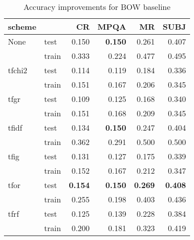 \begin{table}[H]
\begin{center}

\begin{tabular}{llrrrr}
\toprule
scheme &      &  CR &  MPQA &  MR &  SUBJ \\
\midrule
None & test &      0.150 &\textbf{0.150} &      0.261 &        0.407 \\
{} & train &      0.333 &        0.224 &      0.477 &        0.495 \\
tfchi2 & test &      0.114 &        0.119 &      0.184 &        0.336 \\
{} & train &      0.151 &        0.167 &      0.206 &        0.345 \\
tfgr & test &      0.109 &        0.125 &      0.168 &        0.340 \\
{} & train &      0.151 &        0.168 &      0.209 &        0.345 \\
tfidf & test &      0.134 &\textbf{0.150} &      0.247 &        0.404 \\
{} & train &      0.362 &        0.291 &      0.500 &        0.500 \\
tfig & test &      0.131 &        0.127 &      0.175 &        0.339 \\
{} & train &      0.152 &        0.167 &      0.212 &        0.347 \\
tfor & test & \textbf{0.154} &\textbf{0.150} & \textbf{0.269} & \textbf{0.408} \\
{} & train &      0.255 &        0.198 &      0.403 &        0.436 \\
tfrf & test &      0.125 &        0.139 &      0.228 &        0.384 \\
{} & train &      0.200 &        0.181 &      0.323 &        0.419 \\
\bottomrule
\end{tabular}

\caption[Accuracy improvements for BOW baseline]{Accuracy improvements for BOW baseline}
\label{tab:results:bow}
\end{center}
\end{table}




